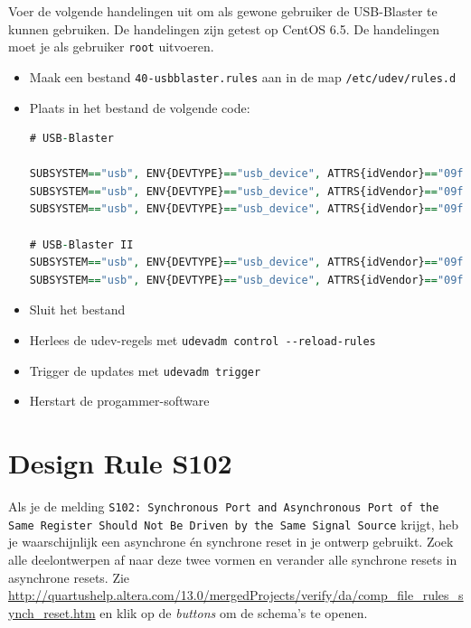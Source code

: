 \documentclass[a4paper,12pt,fleqn,twoside]{book}
\begin{document}
Voer de volgende handelingen uit om als gewone gebruiker de USB-Blaster te
kunnen gebruiken. De handelingen zijn getest op CentOS 6.5. De handelingen
moet je als gebruiker \lstinline|root| uitvoeren.

\begin{itemize}\itemsep-1pt
\item Maak een bestand \lstinline|40-usbblaster.rules| aan in de map
      \lstinline|/etc/udev/rules.d|
\item Plaats in het bestand de volgende code:
\begin{lstlisting}[language=VHDL,numbers=none,belowskip=-3.5ex]
# USB-Blaster

SUBSYSTEM=="usb", ENV{DEVTYPE}=="usb_device", ATTRS{idVendor}=="09fb", ATTRS{idProduct}=="6001", MODE="0666", SYMLINK+="usbblaster/%k"
SUBSYSTEM=="usb", ENV{DEVTYPE}=="usb_device", ATTRS{idVendor}=="09fb", ATTRS{idProduct}=="6002", MODE="0666", SYMLINK+="usbblaster/%k"
SUBSYSTEM=="usb", ENV{DEVTYPE}=="usb_device", ATTRS{idVendor}=="09fb", ATTRS{idProduct}=="6003", MODE="0666", SYMLINK+="usbblaster/%k"

# USB-Blaster II
SUBSYSTEM=="usb", ENV{DEVTYPE}=="usb_device", ATTRS{idVendor}=="09fb", ATTRS{idProduct}=="6010", MODE="0666", SYMLINK+="usbblaster2/%k"
SUBSYSTEM=="usb", ENV{DEVTYPE}=="usb_device", ATTRS{idVendor}=="09fb", ATTRS{idProduct}=="6810", MODE="0666", SYMLINK+="usbblaster2/%k"
\end{lstlisting}
\item Sluit het bestand
\item Herlees de udev-regels met \lstinline|udevadm control --reload-rules|
\item Trigger de updates met \lstinline|udevadm trigger|
\item Herstart de progammer-software
\end{itemize}


\section{Design Rule S102}
Als je de melding \lstinline|S102: Synchronous Port and Asynchronous Port of the Same Register Should Not Be Driven by the Same Signal Source|
krijgt, heb je waarschijnlijk een asynchrone \'{e}n synchrone reset in je
ontwerp gebruikt. Zoek alle deelontwerpen af naar deze twee vormen en verander
alle synchrone resets in asynchrone resets. Zie
\url{http://quartushelp.altera.com/13.0/mergedProjects/verify/da/comp_file_rules_synch_reset.htm}
en klik op de \textsl{buttons} om de schema's te openen.
\end{document}

